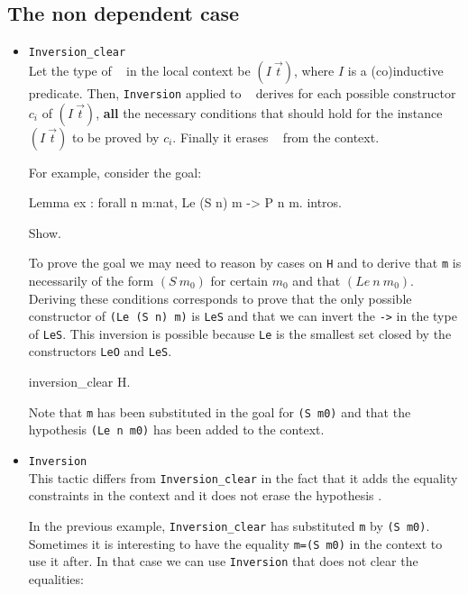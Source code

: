 \subsection{The non dependent case}
\begin{itemize}

\item \texttt{Inversion\_clear} \ident~\\
  Let the type of \ident~ in the local context be $(I~\vec{t})$,
  where $I$ is a (co)inductive predicate. Then,
  \texttt{Inversion} applied to \ident~ derives for each possible
  constructor $c_i$ of $(I~\vec{t})$, {\bf all} the necessary
  conditions that should hold for the instance $(I~\vec{t})$ to be
  proved by $c_i$. Finally it erases \ident~ from the context.



For example, consider the goal:
\begin{coq_eval}
Lemma ex : forall n m:nat, Le (S n) m -> P n m.
intros.
\end{coq_eval}

\begin{coq_example}
Show.
\end{coq_example}

To prove the goal we may need to reason by cases on \texttt{H} and to 
 derive that \texttt{m}  is necessarily of
the form $(S~m_0)$ for certain $m_0$ and that $(Le~n~m_0)$.  
Deriving these conditions corresponds to prove that the
only possible constructor of \texttt{(Le (S n) m)}  is
\texttt{LeS} and that we can invert the 
\texttt{->} in the type  of \texttt{LeS}.  
This inversion is possible because \texttt{Le} is the smallest set closed by
the constructors \texttt{LeO} and \texttt{LeS}.


\begin{coq_example}
inversion_clear H.
\end{coq_example}

Note that \texttt{m} has been substituted in the goal for \texttt{(S m0)}
and that the hypothesis \texttt{(Le n m0)} has been added to the
context.

\item \texttt{Inversion} \ident~\\
  This tactic differs from   {\tt Inversion\_clear} in the fact that
  it adds the equality constraints in the context and
  it does not erase  the hypothesis \ident.


In the previous example, {\tt Inversion\_clear} 
has substituted \texttt{m} by \texttt{(S m0)}. Sometimes it is
interesting to have the equality \texttt{m=(S m0)} in the
context to use it after. In that case we can use  \texttt{Inversion} that
does not clear the equalities:


\end{itemize}
